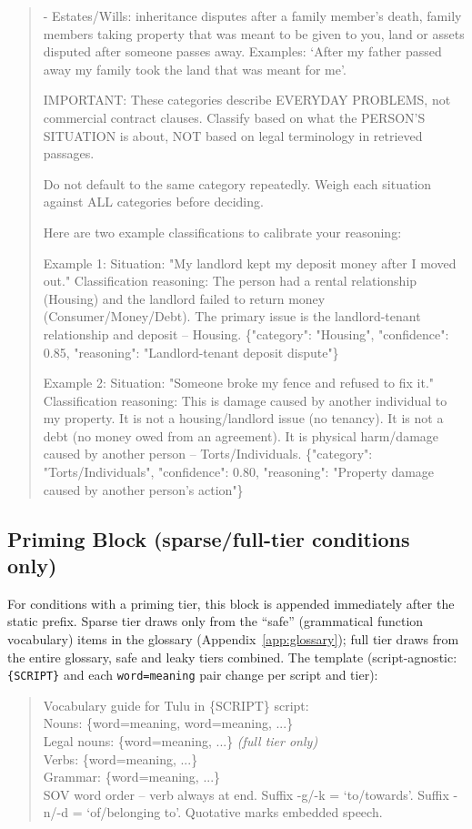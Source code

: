 \documentclass[11pt]{article}
\begin{document}
\begin{quote}
- Estates/Wills: inheritance disputes after a family member's death, family members taking property that was meant to be given to you, land or assets disputed after someone passes away. Examples: `After my father passed away my family took the land that was meant for me'.

IMPORTANT: These categories describe EVERYDAY PROBLEMS, not commercial contract clauses. Classify based on what the PERSON'S SITUATION is about, NOT based on legal terminology in retrieved passages.

Do not default to the same category repeatedly. Weigh each situation against ALL categories before deciding.

Here are two example classifications to calibrate your reasoning:

Example 1:
Situation: "My landlord kept my deposit money after I moved out."
Classification reasoning: The person had a rental relationship (Housing) and the landlord failed to return money (Consumer/Money/Debt). The primary issue is the landlord-tenant relationship and deposit -- Housing.
\{"category": "Housing", "confidence": 0.85, "reasoning": "Landlord-tenant deposit dispute"\}

Example 2:
Situation: "Someone broke my fence and refused to fix it."
Classification reasoning: This is damage caused by another individual to my property. It is not a housing/landlord issue (no tenancy). It is not a debt (no money owed from an agreement). It is physical harm/damage caused by another person -- Torts/Individuals.
\{"category": "Torts/Individuals", "confidence": 0.80, "reasoning": "Property damage caused by another person's action"\}
\end{quote}

\subsection{Priming Block (sparse/full-tier conditions only)}
\label{app:prompt-priming}

For conditions with a priming tier, this block is appended immediately after
the static prefix. Sparse tier draws only from the ``safe'' (grammatical
function vocabulary) items in the glossary (Appendix~\ref{app:glossary});
full tier draws from the entire glossary, safe and leaky tiers combined. The
template (script-agnostic: \texttt{\{SCRIPT\}} and each
\texttt{word=meaning} pair change per script and tier):

\begin{quote}
\ttfamily\small
Vocabulary guide for Tulu in \{SCRIPT\} script:\\
Nouns: \{word=meaning, word=meaning, ...\}\\
Legal nouns: \{word=meaning, ...\} \quad\textit{(full tier only)}\\
Verbs: \{word=meaning, ...\}\\
Grammar: \{word=meaning, ...\}\\
SOV word order -- verb always at end. Suffix -g/-k = `to/towards'. Suffix -n/-d = `of/belonging to'. Quotative marks embedded speech.
\end{quote}
\end{document}
